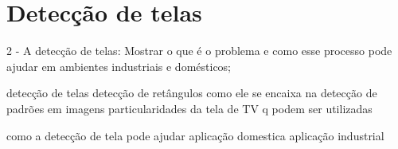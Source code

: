 \chapter{Detec{\c c}\~ao de telas}



2 - A detecção de telas: Mostrar o que é o problema e como esse processo pode ajudar em ambientes industriais e domésticos;

detecção de telas
detecção de retângulos
como ele se encaixa na detecção de padrões em imagens
particularidades da tela de TV q podem ser utilizadas

como a detecção de tela pode ajudar
aplicação domestica
aplicação industrial
